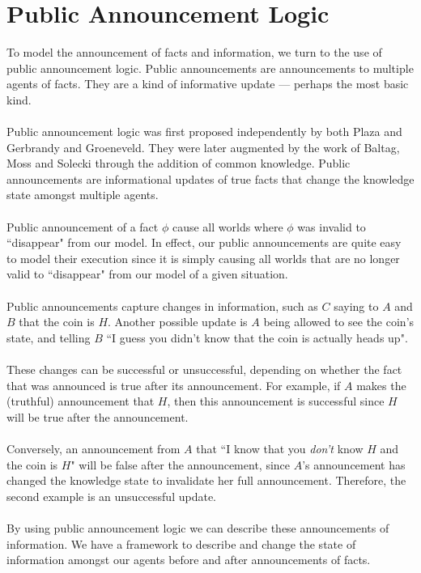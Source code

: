 \documentclass[10pt, a4paper, twoside]{article}
\begin{document}
\section{Public Announcement Logic}\label{pal}
To model the announcement of facts and information, we turn to the use of public
announcement logic.
Public announcements are announcements to multiple agents of facts.
They are a kind of informative update --- perhaps the most basic kind.\\
\\
Public announcement logic was first proposed independently by both Plaza and
Gerbrandy and Groeneveld.
They were later augmented by the work of Baltag, Moss and Solecki through the
addition of common knowledge.
Public announcements are informational updates of true facts that change the
knowledge state amongst multiple agents.\\
\\
Public announcement of a fact $\phi$ cause all worlds where $\phi$ was
invalid to ``disappear" from our model.
In effect, our public announcements are quite easy to model their execution
since it is simply causing all worlds that are no longer valid to ``disappear"
from our model of a given situation.\\
\\
Public announcements capture changes in information, such as $C$ saying to
$A$ and $B$ that the coin is $H$.
Another possible update is $A$ being allowed to see the coin's state, and
telling $B$ ``I guess you didn't know that the coin is actually heads up".\\
\\
These changes can be successful or unsuccessful, depending on whether the fact
that was announced is true after its announcement.
For example, if $A$ makes the (truthful) announcement that $H$, then this
announcement is successful since $H$ will be true after the announcement.\\
\\
Conversely, an announcement from $A$ that ``I know that you {\em don't} know $H$
and the coin is $H$" will be false after the announcement, since $A$'s
announcement has changed the knowledge state to invalidate her full
announcement.
Therefore, the second example is an unsuccessful update.\\
\\
By using public announcement logic we can describe these announcements of
information.
We have a framework to describe and change the state of information amongst our
agents before and after announcements of facts.
\end{document}
